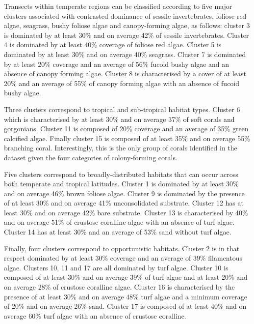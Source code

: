 \begin{refsection}
Transects within temperate regions can be classified according to five
major clusters associated with contrasted dominance of sessile
invertebrates, foliose red algae, seagrass, bushy foliose algae and
canopy-forming algae, as follows: cluster 3 is dominated by at least
30\% and on average 42\% of sessile invertebrates. Cluster 4 is
dominated by at least 40\% coverage of foliose red algae. Cluster 5 is
dominated by at least 30\% and on average 40\% seagrass. Cluster 7 is
dominated by at least 20\% coverage and an average of 56\% fucoid bushy
algae and an absence of canopy forming algae. Cluster 8 is characterised
by a cover of at least 20\% and an average of 55\% of canopy forming
algae with an absence of fucoid bushy algae.

Three clusters correspond to tropical and sub-tropical habitat types.
Cluster 6 which is characterised by at least 30\% and on average 37\% of
soft corals and gorgonians. Cluster 11 is composed of 20\% coverage and
an average of 35\% green calcified algae. Finally cluster 15 is composed
of at least 35\% and on average 55\% branching coral. Interestingly,
this is the only group of corals identified in the dataset given the
four categories of colony-forming corals.

Five clusters correspond to broadly-distributed habitats that can occur
across both temperate and tropical latitudes. Cluster 1 is dominated by
at least 30\% and on average 46\% brown foliose algae. Cluster 9 is
dominated by the presence of at least 30\% and on average 41\%
unconsolidated substrate. Cluster 12 has at least 30\% and on average
42\% bare substrate. Cluster 13 is characterised by 40\% and on average
51\% of crustose coralline algae with an absence of turf algae. Cluster
14 has at least 30\% and an average of 53\% sand without turf algae.

Finally, four clusters correspond to opportunistic habitats. Cluster 2
is in that respect dominated by at least 30\% coverage and an average of
39\% filamentous algae. Clusters 10, 11 and 17 are all dominated by turf
algae. Cluster 10 is composed of at least 30\% and on average 39\% of
turf algae and at least 20\% and on average 28\% of crustose coralline
algae. Cluster 16 is characterised by the presence of at least 30\% and
on average 48\% turf algae and a minimum coverage of 20\% and on average
26\% sand. Cluster 17 is composed of at least 40\% and on average 60\%
turf algae with an absence of crustose coralline.


\end{refsection}
